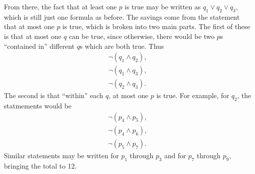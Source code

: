 \documentclass{article}
\begin{document}
From there, the fact that at least one $p$ is true
may be written as $q_1 \lor q_2 \lor q_3$,
which is still just one formula as before.
The savings come from the statement that
at most one $p$ is true,
which is broken into two main parts.
The first of these is that
at most one $q$ can be true,
since otherwise,
there would be two $p$s ``contained in'' different $q$s which are both true.
Thus
\begin{align*}
  \lnot (q_1 \land q_2), \\
  \lnot (q_1 \land q_3), \\
  \lnot (q_2 \land q_3).
\end{align*}
The second is that ``within'' each $q$,
at most one $p$ is true.
For example, for $q_2$, the statmements would be
\begin{align*}
  \lnot (p_4 \land p_5), \\
  \lnot (p_4 \land p_6), \\
  \lnot (p_5 \land p_7).
\end{align*}
Similar statements may be written for $p_1$ through $p_3$
and for $p_7$ through $p_9$,
bringing the total to 12.

\end{document}
